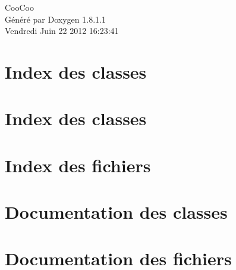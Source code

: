 \documentclass{book}
\begin{document}
\hypersetup{pageanchor=false,citecolor=blue}
\begin{titlepage}
\vspace*{7cm}
\begin{center}
{\Large Coo\-Coo }\\
\vspace*{1cm}
{\large Généré par Doxygen 1.8.1.1}\\
\vspace*{0.5cm}
{\small Vendredi Juin 22 2012 16:23:41}\\
\end{center}
\end{titlepage}
\clearemptydoublepage
{}
\tableofcontents
\clearemptydoublepage
{}
\hypersetup{pageanchor=true,citecolor=blue}
\chapter{Index des classes}

\chapter{Index des classes}

\chapter{Index des fichiers}

\chapter{Documentation des classes}














\chapter{Documentation des fichiers}












\printindex
\end{document}
